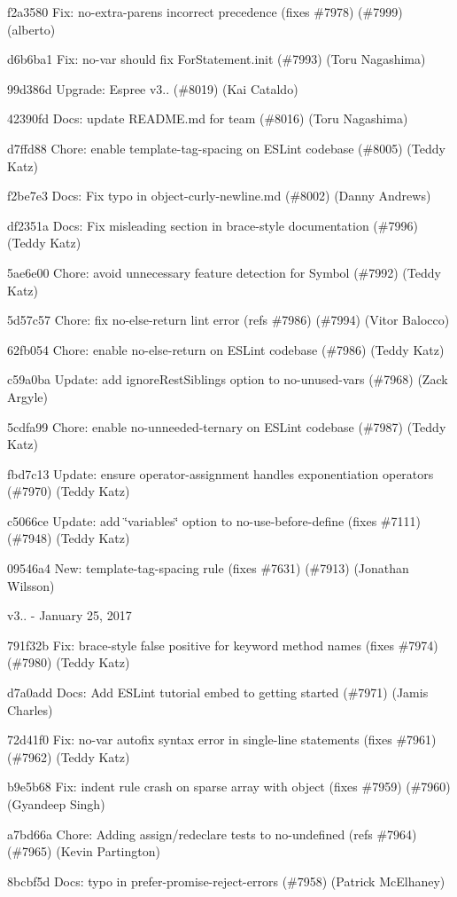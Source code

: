 \begin{DoxyItemize}
\item f2a3580 Fix\+: {\ttfamily no-\/extra-\/parens} incorrect precedence (fixes \#7978) (\#7999) (alberto)
\item d6b6ba1 Fix\+: no-\/var should fix For\+Statement.\+init (\#7993) (Toru Nagashima)
\item 99d386d Upgrade\+: Espree v3.. (\#8019) (Kai Cataldo)
\item 42390fd Docs\+: update R\+E\+A\+D\+M\+E.\+md for team (\#8016) (Toru Nagashima)
\item d7ffd88 Chore\+: enable template-\/tag-\/spacing on E\+S\+Lint codebase (\#8005) (Teddy Katz)
\item f2be7e3 Docs\+: Fix typo in object-\/curly-\/newline.\+md (\#8002) (Danny Andrews)
\item df2351a Docs\+: Fix misleading section in brace-\/style documentation (\#7996) (Teddy Katz)
\item 5ae6e00 Chore\+: avoid unnecessary feature detection for Symbol (\#7992) (Teddy Katz)
\item 5d57c57 Chore\+: fix no-\/else-\/return lint error (refs \#7986) (\#7994) (Vitor Balocco)
\item 62fb054 Chore\+: enable no-\/else-\/return on E\+S\+Lint codebase (\#7986) (Teddy Katz)
\item c59a0ba Update\+: add ignore\+Rest\+Siblings option to no-\/unused-\/vars (\#7968) (Zack Argyle)
\item 5cdfa99 Chore\+: enable no-\/unneeded-\/ternary on E\+S\+Lint codebase (\#7987) (Teddy Katz)
\item fbd7c13 Update\+: ensure operator-\/assignment handles exponentiation operators (\#7970) (Teddy Katz)
\item c5066ce Update\+: add \char`\"{}variables\char`\"{} option to no-\/use-\/before-\/define (fixes \#7111) (\#7948) (Teddy Katz)
\item 09546a4 New\+: {\ttfamily template-\/tag-\/spacing} rule (fixes \#7631) (\#7913) (Jonathan Wilsson)
\end{DoxyItemize}

v3.. -\/ January 25, 2017


\begin{DoxyItemize}
\item 791f32b Fix\+: brace-\/style false positive for keyword method names (fixes \#7974) (\#7980) (Teddy Katz)
\item d7a0add Docs\+: Add E\+S\+Lint tutorial embed to getting started (\#7971) (Jamis Charles)
\item 72d41f0 Fix\+: no-\/var autofix syntax error in single-\/line statements (fixes \#7961) (\#7962) (Teddy Katz)
\item b9e5b68 Fix\+: indent rule crash on sparse array with object (fixes \#7959) (\#7960) (Gyandeep Singh)
\item a7bd66a Chore\+: Adding assign/redeclare tests to no-\/undefined (refs \#7964) (\#7965) (Kevin Partington)
\item 8bcbf5d Docs\+: typo in prefer-\/promise-\/reject-\/errors (\#7958) (Patrick Mc\+Elhaney)
\end{DoxyItemize}

